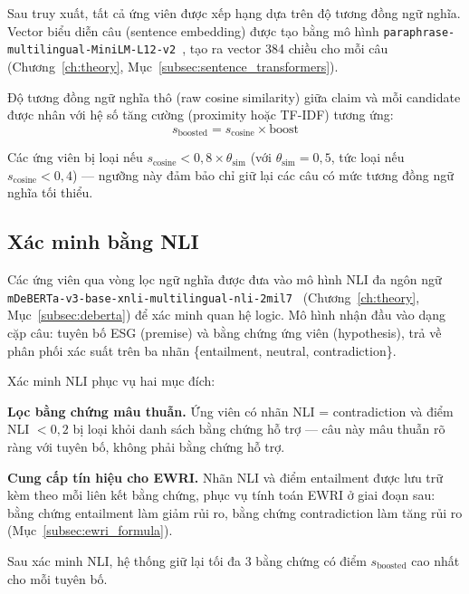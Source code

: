 Sau truy xuất, tất cả ứng viên được xếp hạng dựa trên độ tương đồng ngữ nghĩa. Vector biểu diễn câu (sentence embedding) được tạo bằng mô hình \texttt{paraphrase-multilingual-MiniLM-L12-v2}~\cite{reimers2019sentence}, tạo ra vector 384 chiều cho mỗi câu (Chương~\ref{ch:theory}, Mục~\ref{subsec:sentence_transformers}).

Độ tương đồng ngữ nghĩa thô (raw cosine similarity) giữa claim và mỗi candidate được nhân với hệ số tăng cường (proximity hoặc TF-IDF) tương ứng:
\begin{equation}
    s_{\text{boosted}} = s_{\text{cosine}} \times \text{boost}
    \label{eq:boosted_sim}
\end{equation}

Các ứng viên bị loại nếu $s_{\text{cosine}} < 0{,}8 \times \theta_{\text{sim}}$ (với $\theta_{\text{sim}} = 0{,}5$, tức loại nếu $s_{\text{cosine}} < 0{,}4$) --- ngưỡng này đảm bảo chỉ giữ lại các câu có mức tương đồng ngữ nghĩa tối thiểu.


\subsection{Xác minh bằng NLI}
\label{subsec:nli_verification}

Các ứng viên qua vòng lọc ngữ nghĩa được đưa vào mô hình NLI đa ngôn ngữ \texttt{mDeBERTa-v3-base-xnli-multilingual-nli-2mil7}~\cite{laurer2023building} (Chương~\ref{ch:theory}, Mục~\ref{subsec:deberta}) để xác minh quan hệ logic. Mô hình nhận đầu vào dạng cặp câu: tuyên bố ESG (premise) và bằng chứng ứng viên (hypothesis), trả về phân phối xác suất trên ba nhãn \{entailment, neutral, contradiction\}.

Xác minh NLI phục vụ hai mục đích:

\textbf{Lọc bằng chứng mâu thuẫn.} Ứng viên có nhãn NLI = contradiction và điểm NLI $< 0{,}2$ bị loại khỏi danh sách bằng chứng hỗ trợ --- câu này mâu thuẫn rõ ràng với tuyên bố, không phải bằng chứng hỗ trợ.

\textbf{Cung cấp tín hiệu cho EWRI.} Nhãn NLI và điểm entailment được lưu trữ kèm theo mỗi liên kết bằng chứng, phục vụ tính toán EWRI ở giai đoạn sau: bằng chứng entailment làm giảm rủi ro, bằng chứng contradiction làm tăng rủi ro (Mục~\ref{subsec:ewri_formula}).

Sau xác minh NLI, hệ thống giữ lại tối đa 3 bằng chứng có điểm $s_{\text{boosted}}$ cao nhất cho mỗi tuyên bố.



